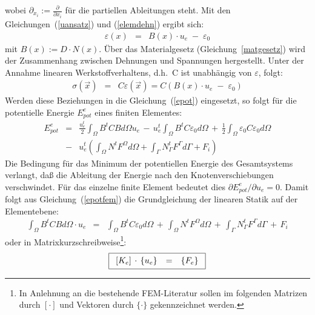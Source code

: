 wobei $\partial_{x_{i}} := \frac{\partial}{\partial x_{i}}$ für die
partiellen Ableitungen steht. Mit den Gleichungen~(\ref{uansatz}) und
(\ref{elemdehn}) ergibt sich:
\begin{eqnarray}
\label{dehnversch}
 \varepsilon(x) & = & B(x) \cdot u_{e} \; - \; \varepsilon_{0}
\end{eqnarray}
mit  $B(x) := D \cdot N(x)$. Über das Materialgesetz
(Gleichung~\ref{matgesetz})
wird der Zusammenhang zwischen Dehnungen und Spannungen hergestellt.
Unter der Annahme linearen Werkstoffverhaltens, d.h.\ C ist unabhängig
von $\varepsilon$, folgt:
\begin{eqnarray}
\label{sigmaelem}
 \sigma(\vec x) & = & C \varepsilon(\vec x)
                  = C \left( B(x) \cdot u_{e} \; - \; \varepsilon_{0} \right)
\end{eqnarray}
Werden diese Beziehungen in die Gleichung~(\ref{epot}) eingesetzt, so folgt
für die potentielle Energie $E_{pot}^{e}$ eines finiten Elementes:
\begin{eqnarray}
\label{epotfem}
  E_{pot}^{e} & = &
  \frac{u_{e}^{t}}{2} \int_{\Omega} B^{t} C B d\Omega u_{e} \, - \,
  u_{e}^{t} \int_{\Omega} B^{t} C \varepsilon_{0} d\Omega \, + \,
  \frac{1}{2} \int_{\Omega} \varepsilon_{0} C \varepsilon_{0} d\Omega
  \nonumber \\
  & - & u_{e}^{t} \left( \int_{\Omega} N^{t} F^{\Omega} d\Omega
	+ \int_{\Gamma} N^{t}_{\Gamma} F^{\Gamma} d\Gamma + F_{i} \right)
\end{eqnarray}
Die Bedingung für das Minimum der potentiellen Energie des Gesamtsystems
verlangt, daß die Ableitung der Energie nach den Knotenverschiebungen
verschwindet. Für das einzelne finite Element bedeutet dies
$\partial E_{pot}^{e} / \partial u_{e} = 0$. Damit folgt aus
Gleichung~(\ref{epotfem}) die Grundgleichung der linearen Statik auf
der Elementebene:
\begin{eqnarray}
\label{intstatik}
  \int_{\Omega} B^{t} C B d\Omega \cdot u_{e}
  & = &
  \int_{\Omega} B^{t} C \varepsilon_{0} d\Omega \, + \,
  \int_{\Omega} N^{t} F^{\Omega} d\Omega \, + \,
  \int_{\Gamma} N^{t}_{\Gamma} F^{\Gamma} d\Gamma \, + \, F_{i}
\end{eqnarray}
oder in Matrixkurzschreibweise\footnote{In Anlehnung an die bestehende
FEM-Literatur \cite{Koh92} sollen im folgenden Matrizen durch $[\cdot]$ und
Vektoren durch $\{ \cdot \}$ gekennzeichnet werden.}:
\begin{equation}
\label{linstatik}
\fbox{$
 \displaystyle
 \begin{array}{rcl}
  [K_{e}] \, \cdot \, \{u_{e}\} & = & \{F_{e}\}
 \end{array}
 $}
\end{equation}
